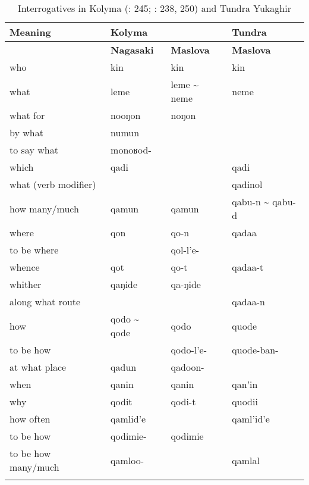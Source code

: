 \begin{table}
\caption{Interrogatives in Kolyma (\citealt{Nagasaki2011}: 245; \citealt{Maslova2003a}: 238, 250) and Tundra Yukaghir \citep[41]{Maslova2003b}}
\label{tab:yuka:9}
\begin{tabularx}{\textwidth}{lXXX}
\lsptoprule

\textbf{Meaning} & \textbf{Kolyma} &  & \textbf{Tundra}\\
\midrule
& \textbf{Nagasaki} & \textbf{Maslova} & \textbf{Maslova}\\
\midrule
who & kin & kin & kin\\
what & leme & leme {\textasciitilde} neme & neme\\
what for & nooŋon & noŋon & \\
by what & numun &  & \\
to say what & monoʁod- &  & \\
which & qadi &  & qadi\\
what (verb modifier) &  &  & qadinol\\
how many/much & qamun & qamun & qabu-n {\textasciitilde} qabu-d\\
where & qon & qo-n & qadaa\\
to be where &  & qol-l’e- & \\
whence & qot & qo-t & qadaa-t\\
whither & qaŋide & qa-ŋide & \\
along what route &  &  & qadaa-n\\
how & qodo {\textasciitilde} qode & qodo & quode\\
to be how &  & qodo-l’e- & quode-ban-\\
at what place & qadun & qadoon- & \\
when & qanin & qanin & qan’in\\
why & qodit & qodi-t & quodii\\
how often & qamlid’e &  & qaml’id’e\\
to be how & qodimie- & qodimie & \\
to be how many/much & qamloo- &  & qamlal\\
\lspbottomrule
\end{tabularx}
\end{table}

